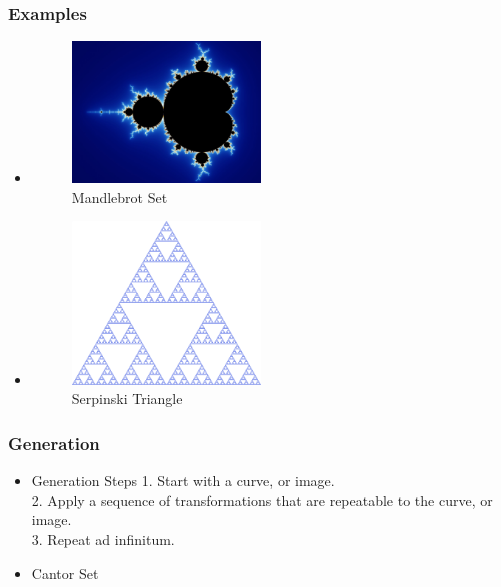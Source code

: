\documentclass{beamer}
\begin{document}
\begin{frame}
	\frametitle{Examples}
	\begin{minipage}[t]{0.48\linewidth}
        \begin{itemize}
            \item<2-> 
            \centering
            \begin{figure}
            	\includegraphics[width=5cm]{mandlebrot}
            	\caption{Mandlebrot Set}
            \end{figure}
        \end{itemize}
    \end{minipage}
    \hfill
    \begin{minipage}[t]{0.48\linewidth}%
        \begin{itemize}
            \item<3-> 
            \centering
            \begin{figure}
            	\includegraphics[width=5cm]{serpinski}
            	\caption{Serpinski Triangle}
            \end{figure}
        \end{itemize}
    \end{minipage}
\end{frame}

\begin{frame}
	\frametitle{Generation}
	\begin{itemize}
		\item<2->
		\begin{block}{Generation Steps}
			1. Start with a curve, or image.\\
			2. Apply a sequence of transformations that are repeatable to the curve, or image.\\
			3. Repeat ad infinitum.\\
		\end{block}
		\item<3->
		\begin{example}
			Cantor Set
		\end{example}
	\end{itemize}
\end{frame}
\end{document}

